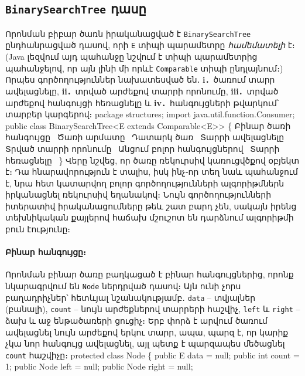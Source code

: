 \subsection{\texttt{BinarySearchTree} դասը}
Որոնման բիբար ծառն իրականացված է \texttt{BinarySearchTree}
ընդհանրացված դասով, որի \texttt{E} տիպի պարամետրը 
\emph{համեմատելի} է։ (Java լեզվում այդ պահանջը նշվում է 
տիպի պարամետրից պահանջելով, որ այն լինի մի որևէ 
\texttt{Comparable} տիպի ընդլայնում։)
Որպես գործողություններ նախատեսված են․ 
\textbf{i․}~ծառում տարր ավելացնելը, 
\textbf{ii․}~տրված արժեքով տարրի որոնումը, 
\textbf{iii․}~տրված արժեքով հանգույցի հեռացնելը և 
\textbf{iv․}~հանգույցների թվարկում՝ տարբեր կարգերով։
\endmoddef{}
package structures;
import java.util.function.Consumer;
public class BinarySearchTree<E extends Comparable<E>> \{
  \LA{}Բինար ծառի հանգույցը~{\nwtagstyle{}}\RA{}
  \LA{}Ծառի արմատը~{\nwtagstyle{}}\RA{}
  \LA{}Դատարկ ծառ~{\nwtagstyle{}}\RA{}
  \LA{}Տարրի ավելացնելը~{\nwtagstyle{}}\RA{}
  \LA{}Տրված տարրի որոնումը~{\nwtagstyle{}}\RA{}
  \LA{}Անցում բոլոր հանգույցներով~{\nwtagstyle{}}\RA{}
  \LA{}Տարրի հեռացնելը~{\nwtagstyle{}}\RA{}
\}
\nwendcode{}\nwdocspar
Վերը նշվեց, որ ծառը ռեկուրսիվ կառուցվծքով օբյեկտ է։ Դա 
հնարավորություն է տալիս, իսկ ինչ֊որ տեղ նաև պահանջում է, 
նրա հետ կատարվող բոլոր գործողությունների ալգորիթմներն 
իրկանացնել ռեկուրսիվ եղանակով։ Նույն գործողությունների 
իտերատիվ իրականացումները թեև շատ բարդ չեն, սակայն իրենց
տեխնիկական քայլերով հաճախ մշուշոտ են դարձնում ալգորիթմի
բուն էությունը։ 

%
\paragraph{Բինար հանգույցը։} 
Որոնման բինար ծառը բաղկացած է բինար հանգույցներից, որոնք
նկարագրվում են \texttt{Node} ներդրված դասով։ Այն ունի 
չորս բաղադրիչներ՝ հետևյալ նշանակությամբ․ 
\texttt{data} -- տվյալներ (բանալի),
\texttt{count} -- նույն արժեքներով տարրերի հաշվիչ,
\texttt{left} և \texttt{right} -- ձախ և աջ ենթածառերի ցուցիչ։
Երբ փորձ է արվում ծառում ավելացնել նույն արժեքով երկու տարր,
ապա, պարզ է, որ կարիք չկա նոր հանգույց ավելացնել, այլ պետք է
պարզապես մեծացնել \texttt{count} հաշվիչը։
\nwenddocs{}\endmoddef{}
protected class Node \{
  public E data = null;
  public int count = 1;
  public Node left = null;
  public Node right = null;

